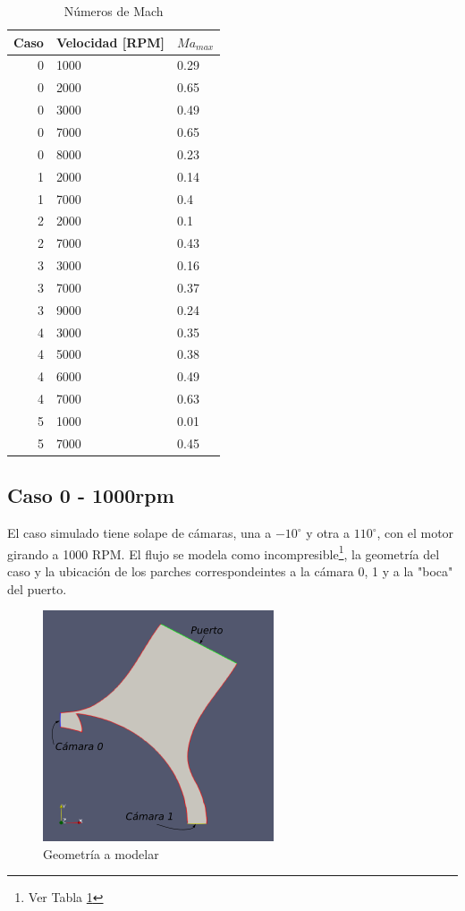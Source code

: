 \documentclass[11pt]{article}
\begin{document}
\begin{table}
    \centering
    \begin{tabular}{rll}\toprule
        Caso & Velocidad [RPM] & $Ma_{max}$ \\ \midrule
        0 & 1000 & 0.29 \\
        0 & 2000 & 0.65 \\
        0 & 3000 & 0.49 \\
        0 & 7000 & 0.65 \\
        0 & 8000 & 0.23 \\
        1 & 2000 & 0.14 \\
        1 & 7000 & 0.4 \\
        2 & 2000 & 0.1 \\
        2 & 7000 & 0.43 \\
        3 & 3000 & 0.16 \\
        3 & 7000 & 0.37 \\
        3 & 9000 & 0.24 \\
        4 & 3000 & 0.35 \\
        4 & 5000 & 0.38 \\
        4 & 6000 & 0.49 \\
        4 & 7000 & 0.63 \\
        5 & 1000 & 0.01 \\
        5 & 7000 & 0.45 \\ \bottomrule
    \end{tabular}
    \caption{Números de Mach}
    \label{tab:mach}
\end{table}

\subsection{Caso 0 - 1000rpm}

El caso simulado tiene solape de cámaras, una a $-10^{\circ}$ y otra a
$110^{\circ}$, con el motor girando a 1000 RPM.
%
El flujo se modela como incompresible\footnote{Ver Tabla \ref{tab:mach}}, la
geometría del caso y la ubicación de los parches correspondeintes a la cámara
0, 1 y a la "boca" del puerto.

\begin{figure}
    \centering
    \includegraphics{caso0.png}
    \caption{Geometría a modelar}
    \label{fig:caso0}
\end{figure}
\end{document}
